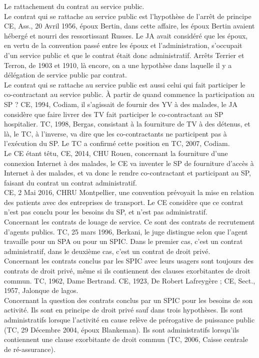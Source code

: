 \documentclass[10pt, a4paper, openany]{book}
\begin{document}
Le rattachement du contrat au service public. \\
Le contrat qui se rattache au service public est l'hypothèse de l'arrêt de principe CE, Ass., 20 Avril 1956, époux Bertin, dans cette affaire, les époux Bertin avaient hébergé et nourri des ressortissant Russes. Le JA avait considéré que les époux, en vertu de la convention passé entre les époux et l'administration, s'occupait d'un service public et que le contrat était donc administratif. Arrêts Terrier et Terron, de 1903 et 1910, là encore, on a une hypothèse dans laquelle il y a délégation de service public par contrat. \\
Le contrat qui se rattache au service public est aussi celui qui fait participer le co-contractant au service public. À partir de quand commence la participation au SP ? CE, 1994, Codiam, il s'agissait de fournir des YV à des malades, le JA considère que faire livrer des TV fait participer le co-contractant au SP hospitalier. TC, 1998, Bergas, consistant à la fourniture de TV à des détenus, et là, le TC, à l'inverse, va dire que les co-contractants ne participent pas à l'exécution du SP. Le TC a confirmé cette position en TC, 2007, Codiam. \\
Le CE étant têtu, CE, 2014, CHU Rouen, concernant la fourniture d'une connexion Internet à des malades, le CE va inventer le SP de fourniture d'accès à Internet à des malades, et va donc le rendre co-contractant et participant au SP, faisant du contrat un contrat administratif. \\
CE, 2 Mai 2016, CHRU Montpellier, une convention prévoyait la mise en relation des patients avec des entreprises de transport. Le CE considère que ce contrat n'est pas conclu pour les besoins du SP, et n'est pas administratif. \\
Concernant les contrats de louage de service. Ce sont des contrats de recrutement d'agents publics. TC, 25 mars 1996, Berkani, le juge distingue selon que l'agent travaille pour un SPA ou pour un SPIC. Dans le premier cas, c'est un contrat administratif, dans le deuxième cas, c'est un contrat de droit privé. \\
Concernant les contrats conclus par les SPIC avec leurs usagers sont toujours des contrats de droit privé, même si ils contiennent des clauses exorbitantes de droit commun. TC, 1962, Dame Bertrand. CE, 1923, De Robert Lafreygère ; CE, Sect., 1957, Jalonque de lagos. \\
Concernant la question des contrats conclus par un SPIC pour les besoins de son activité. Ils sont en principe de droit privé sauf dans trois hypothèses. Ils sont administratifs lorsque l'activité en cause relève de prérogative de puissance public (TC, 29 Décembre 2004, époux Blankeman). Ils sont administratifs lorsqu'ils contiennent une clause exorbitante de droit commun (TC, 2006, Caisse centrale de ré-assurance). 
\end{document}
